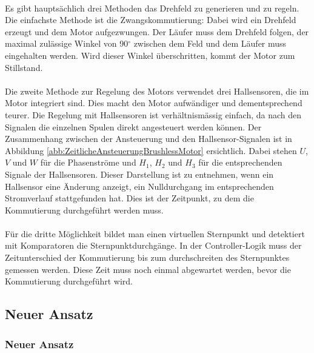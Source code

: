       \fi
       \\
        Es gibt hauptsächlich drei Methoden das Drehfeld zu generieren und zu 
        regeln. Die einfachste Methode ist die Zwangskommutierung: 
        Dabei wird ein Drehfeld erzeugt und dem Motor aufgezwungen. Der Läufer 
        muss dem Drehfeld folgen, der maximal zulässige Winkel von 90$^\circ$
        zwischen dem Feld und dem Läufer muss eingehalten werden. Wird dieser 
        Winkel überschritten, kommt der Motor zum Stillstand.\\
        \\
        Die zweite Methode zur Regelung des Motors verwendet drei Hallsensoren, die im 
        Motor integriert sind. Dies macht den Motor aufwändiger und 
        dementsprechend teurer. Die Regelung mit Hallsensoren ist 
        verhältnismässig einfach, da nach den Signalen die einzelnen Spulen 
        direkt angesteuert werden können. Der Zusammenhang zwischen der 
        Ansteuerung und den Hallsensor-Signalen ist in Abbildung 
        \ref{abb:ZeitlicheAnsteuerungBrushlessMotor} ersichtlich. Dabei stehen 
        $U$, $V$ und $W$ für die Phasenströme und $H_1$, $H_2$ und $H_3$ für die 
        entsprechenden Signale der Hallsensoren. Dieser Darstellung ist zu 
        entnehmen, wenn ein Hallsensor eine Änderung anzeigt, 
        ein Nulldurchgang im entsprechenden Stromverlauf stattgefunden hat. 
        Dies ist der Zeitpunkt, zu dem die Kommutierung durchgeführt werden 
        muss.\\
        \\
        Für die dritte Möglichkeit bildet man einen virtuellen Sternpunkt 
        und detektiert mit Komparatoren die Sternpunktdurchgänge. 
        In der Controller-Logik muss der Zeitunterschied der Kommutierung 
        bis zum durchschreiten des Sternpunktes gemessen werden. Diese Zeit 
        muss noch einmal abgewartet werden, bevor die Kommutierung durchgeführt 
        wird.
    \ifSTANDALONE
    \subsection{Neuer Ansatz}
    \fi
    \ifEMBED
    \subsubsection{Neuer Ansatz}
    \fi


